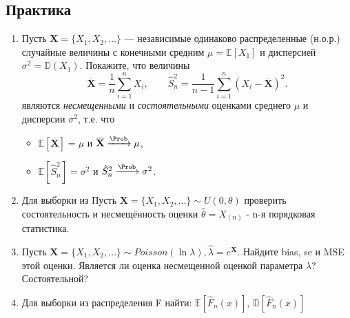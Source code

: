 \documentclass[a4paper, 14pt]{extarticle}
\begin{document}
\subsection*{Практика}
\begin{enumerate}

\item Пусть $\textbf{X} = \{X_1, X_2, \dots\}$ --- независимые одинаково распределенные (н.о.р.) случайные величины  с конечными средним 
$\mu = \mathbb{E}[X_1]$ и 
дисперсией $\sigma^2 = \mathbb{D}(X_1)$. Покажите, что величины
$$
\overline{\textbf{X}} = \frac{1}{n}\sum_{i=1}^n X_i, \qquad \hat S^2_n = \frac{1}{n - 1} \sum_{i=1}^n (X_i - \overline{\textbf{X}})^2.
$$
являются \textit{несмещенными} и \textit{состоятельными} оценками среднего $\mu$ и дисперсии $\sigma^2$, т.е. что
\begin{itemize}
	\item $\mathbb{E}[\overline{\textbf{X}}] = \mu$ и $\overline{\textbf{X}} \xrightarrow{\Prob} \mu$,
	\item $\mathbb{E}[\hat S^2_n] = \sigma^2$ и $\hat S^2_n \xrightarrow{\Prob} \sigma^2$.
\end{itemize}

\item Для выборки из Пусть $\textbf{X} = \{X_1, X_2, \dots\} \sim U(0, \theta)$ проверить состоятельность и несмещённость оценки $\hat\theta = X_(n)$ - n-я порядковая статистика.

\item Пусть $\textbf{X} = \{X_1, X_2, \dots\} \sim Poisson(\ln{\lambda}), \hat\lambda = e^{\overline{\textbf{X}}}$. Найдите bias, se и MSE этой оценки. Является
ли оценка несмещенной оценкой параметра $\lambda$? Состоятельной?

\item Для выборки из распределения F  найти: $\mathbb{E}[\hat F_n(x)]$, $\mathbb{D}[\hat F_n(x)]$



\end{enumerate}
\newpage
\end{document}
